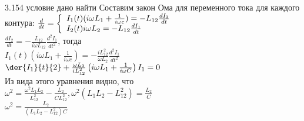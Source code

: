\testCom
{%
	3.154
}
{%
	условие
}
{%
	дано
}
{%
	найти
}
{%
	Составим закон Ома для переменного тока для каждого контура:
	$\frac{d}{dt} = \left\{\begin{array}{l l}
			I_1(t) (i \omega L_1 + \frac{1}{i \omega c}) = - L_{12} \frac{d I_2}{dt} \\
			I_2(t) i \omega L_2  = - L_{12} \frac{d I_1}{dt} 
			\end{array}\right.$\\
	$\frac{d I_2}{dt} = - \frac{L_{12}}{i \omega L_{12}} \frac{d^2 I_1}{dt^2}$, тогда\\
	$I_1(t)(i \omega L_1 + \frac{1}{i \omega c}) = - \frac{i L_{12}^2}{\omega L_2} \frac{d^2 I_1}{dt^2}$\\
	$\der{I_1}{t}{2} + \frac{\omega L_2}{i L_{12}^2} \left(i \omega L_1 + \frac{1}{i \omega C} \right) I_1 = 0$\\
	Из вида этого уравнения видно, что\\
	$\omega^2 = \frac{\omega^2 L_1 L_2}{L_{12}^2} - \frac{L_2}{CL_{12}^2}, \omega^2 (L_1 L_2 - L_{12}^2) = \frac{L_2}{C}$\\
	$\omega^2 = \frac{L_2}{(L_1 L_2 - L_{12}^2)C}$\\
}

